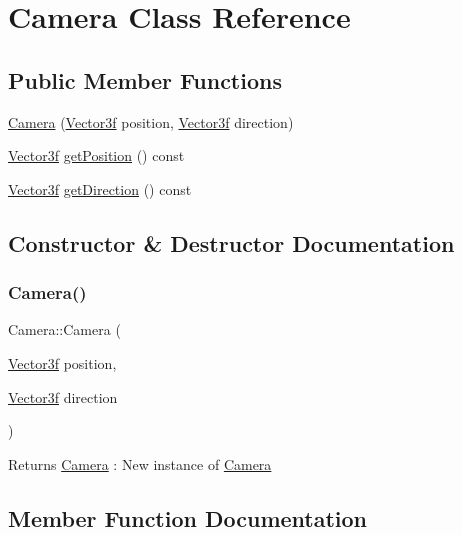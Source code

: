\hypertarget{class_camera}{}\section{Camera Class Reference}
\label{class_camera}
\subsection*{Public Member Functions}
\begin{DoxyCompactItemize}
\item 
\mbox{\hyperlink{class_camera_a7992e90d78d3ad86ad83ba4a4879fc48}{Camera}} (\mbox{\hyperlink{class_vector3f}{Vector3f}} position, \mbox{\hyperlink{class_vector3f}{Vector3f}} direction)
\item 
\mbox{\hyperlink{class_vector3f}{Vector3f}} \mbox{\hyperlink{class_camera_a4e257bcf641d333ce77bac775792a9c3}{get\+Position}} () const
\item 
\mbox{\hyperlink{class_vector3f}{Vector3f}} \mbox{\hyperlink{class_camera_ad28f4c7b4ee77d2837c20beeb94d00c2}{get\+Direction}} () const
\end{DoxyCompactItemize}


\subsection{Constructor \& Destructor Documentation}
\mbox{\label{class_camera_a7992e90d78d3ad86ad83ba4a4879fc48}} 
\subsubsection{\texorpdfstring{Camera()}{Camera()}}
{\footnotesize\ttfamily Camera\+::\+Camera (\begin{DoxyParamCaption}\item[{\mbox{\hyperlink{class_vector3f}{Vector3f}}}]{position,  }\item[{\mbox{\hyperlink{class_vector3f}{Vector3f}}}]{direction }\end{DoxyParamCaption})}

\begin{DoxyReturn}{Returns}
\mbox{\hyperlink{class_camera}{Camera}} \+: New instance of \mbox{\hyperlink{class_camera}{Camera}} 
\end{DoxyReturn}


\subsection{Member Function Documentation}
\mbox{\label{class_camera_ad28f4c7b4ee77d2837c20beeb94d00c2}} 
